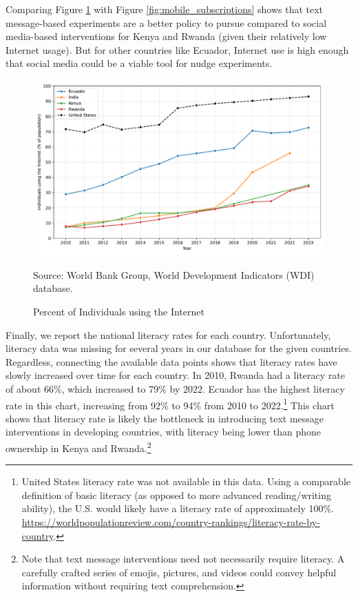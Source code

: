 \documentclass[12pt]{article}
\begin{document}
Comparing Figure \ref{fig:internet_use} with Figure \ref{fig:mobile_subscriptions} shows that text message-based experiments are a better policy to pursue compared to social media-based interventions for Kenya and Rwanda (given their relatively low Internet usage). But for other countries like Ecuador, Internet use is high enough that social media could be a viable tool for nudge experiments.

\begin{figure}[H]
    \centering
    \caption{Percent of Individuals using the Internet}
    \includegraphics[width=\textwidth]{../output/individuals_using_internet.pdf}
    \begin{minipage}{0.9\textwidth}
    \footnotesize
    Source: World Bank Group, World Development Indicators (WDI) database. 
    \end{minipage}
    \label{fig:internet_use}
\end{figure}

Finally, we report the national literacy rates for each country. Unfortunately, literacy data was missing for several years in our database for the given countries. Regardless, connecting the available data points shows that literacy rates have slowly increased over time for each country. In 2010, Rwanda had a literacy rate of about 66\%, which increased to 79\% by 2022. Ecuador has the highest literacy rate in this chart, increasing from 92\% to 94\% from 2010 to 2022.\footnote{United States literacy rate was not available in this data. Using a comparable definition of basic literacy (as opposed to more advanced reading/writing ability), the U.S. would likely have a literacy rate of approximately 100\%. \url{https://worldpopulationreview.com/country-rankings/literacy-rate-by-country}.} This chart shows that literacy rate is likely the bottleneck in introducing text message interventions in developing countries, with literacy being lower than phone ownership in Kenya and Rwanda.\footnote{Note that text message interventions need not necessarily require literacy. A carefully crafted series of emojis, pictures, and videos could convey helpful information without requiring text comprehension.}
\end{document}

